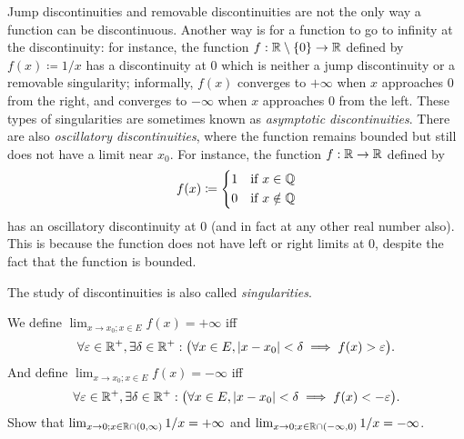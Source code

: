 \begin{rmk}\label{i:9.5.4}
  Jump discontinuities and removable discontinuities are not the only way a function can be discontinuous.
  Another way is for a function to go to infinity at the discontinuity:
  for instance, the function \(f : \mathbb{R} \setminus \left\lbrace0\right\rbrace \to \mathbb{R}\) defined by \(f(x) \coloneqq 1 / x\) has a discontinuity at \(0\) which is neither a jump discontinuity or a removable singularity;
  informally, \(f(x)\) converges to \(+\infty\) when \(x\) approaches \(0\) from the right, and converges to \(-\infty\) when \(x\) approaches \(0\) from the left.
  These types of singularities are sometimes known as \emph{asymptotic discontinuities}.
  There are also \emph{oscillatory discontinuities}, where the function remains bounded but still does not have a limit near \(x_0\).
  For instance, the function \(f : \mathbb{R} \to \mathbb{R}\) defined by
  \[
    f(x) \coloneqq \begin{dcases}
      1 & \text{if } x \in \mathbb{Q}    \\
      0 & \text{if } x \notin \mathbb{Q}
    \end{dcases}
  \]
  has an oscillatory discontinuity at \(0\) (and in fact at any other real number also).
  This is because the function does not have left or right limits at \(0\), despite the fact that the function is bounded.
\end{rmk}

\begin{note}
  The study of discontinuities is also called \emph{singularities}.
\end{note}

\begin{ac}\label{i:ac:9.5.2}
  We define \(\lim_{x \to x_0 ; x \in E} f(x) = +\infty\) iff
  \[
    \forall \varepsilon \in \mathbb{R}^+, \exists \delta \in \mathbb{R}^+ : \big(\forall x \in E, \left\lvert x - x_0\right\rvert < \delta \implies f(x) > \varepsilon\big).
  \]
  And define \(\lim_{x \to x_0 ; x \in E} f(x) = -\infty\) iff
  \[
    \forall \varepsilon \in \mathbb{R}^+, \exists \delta \in \mathbb{R}^+ : \big(\forall x \in E, \left\lvert x - x_0\right\rvert < \delta \implies f(x) < -\varepsilon\big).
  \]
  Show that \(\lim_{x \to 0 ; x \in \mathbb{R} \cap (0, \infty)} 1 / x = +\infty\) and \(\lim_{x \to 0 ; x \in \mathbb{R} \cap (-\infty, 0)} 1 / x = -\infty\).
\end{ac}

